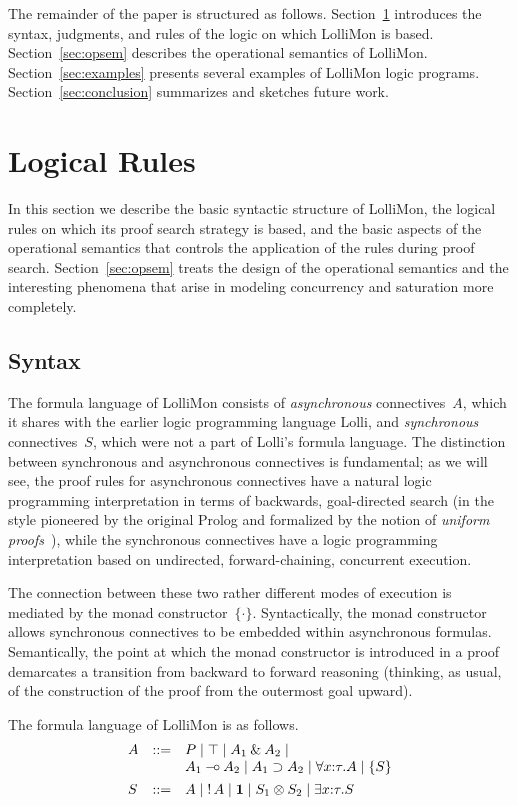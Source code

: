 \documentclass{sig-alt}
\begin{document}
The remainder of the paper is structured as follows.
Section~\ref{sec:logical-rules} introduces the syntax, judgments, and
  rules of the logic on which LolliMon is based.
Section~\ref{sec:opsem} describes the operational semantics of LolliMon.
Section~\ref{sec:examples} presents several examples of LolliMon logic
  programs.
Section~\ref{sec:conclusion} summarizes and sketches future work.

\section{Logical Rules}
\label{sec:logical-rules}

In this section
 we describe the basic syntactic structure of LolliMon,
the logical rules on which its proof search strategy is based, and the
basic aspects of the operational semantics that controls the application of
the rules during proof search. Section~\ref{sec:opsem} treats the design
of the operational semantics and the interesting phenomena that arise
in modeling concurrency and saturation more completely.

\subsection{Syntax}
The formula language of LolliMon consists of \emph{asynchronous}
connectives~$A$, which it shares with the earlier logic programming
language Lolli, and \emph{synchronous} connectives~$S$, which were not
a part of Lolli's formula language.  The distinction between
synchronous and asynchronous connectives is fundamental; as we will
see, the proof rules for asynchronous connectives have a natural logic
programming interpretation in terms of backwards, goal-directed search
(in the style pioneered by the original Prolog and formalized by the
notion of \emph{uniform proofs}~\cite{Miller91apal}), while the
synchronous connectives have a logic programming interpretation based
on undirected, forward-chaining, concurrent execution.

The connection between these two rather different modes of execution is
mediated by the monad constructor~$\{\cdot\}$. Syntactically, the monad
constructor allows synchronous connectives to be embedded within
asynchronous formulas. Semantically, the point at which the monad
constructor is introduced in a proof demarcates a transition from
backward to forward reasoning (thinking, as usual, of the construction
of the proof from the outermost goal upward).

The formula language of LolliMon is as follows.
$$
\begin{array}{lll}
A & ::= &  P 
      \mid \top 
      \mid A_1 \mathbin{\&} A_2 
      \mid \\&& A_1 \mathbin{-\hspace{-0.70mm}\circ} A_2 
      \mid A_1 \supset A_2 
      \mid \forall x{:}\tau.A  
      \mid \{ S \} 
\\[1ex]
S & ::= &  A
      \mid \mathop{!} A
      \mid \textbf{1} 
      \mid S_1 \otimes S_2 
      \mid \exists x{:}\tau.S 
\end{array}
$$
\end{document}
